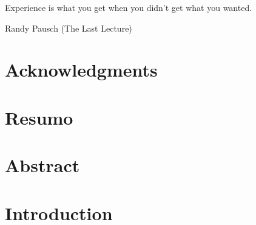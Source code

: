 \documentclass[11pt,a4paper,twoside]{book} %
\begin{document}
	
	\thispagestyle{empty}
	
	
	\newpage
	\thispagestyle{plain}
	
	\newpage
	\thispagestyle{plain}
	\mbox{}
	
	
	\thispagestyle{empty}

	\vspace*{0.8\textheight}
	\setlength{\epigraphwidth}{9cm}
	\renewcommand{\textflush}{flushright}
	\epigraph{Experience is what you get when you didn’t get what you wanted.}
	            {Randy Pausch (The Last Lecture)}

	\cleardoublepage
	
	\chapter*{Acknowledgments}
	

	\newpage
	\thispagestyle{plain}
	\mbox{}
		
	\chapter*{Resumo}
	
	
	\newpage
	\thispagestyle{plain}
	\mbox{}
	
	\chapter*{Abstract}
	
	
	\newpage
	\thispagestyle{plain}
	\mbox{}
	
	\tableofcontents{}
	
	\newpage
	\thispagestyle{plain}
	\mbox{}
	
	\cleardoublepage
	\listoffigures
	\newpage
	\thispagestyle{plain}
	\mbox{}	
	\cleardoublepage
	\listoftables

	\chapter*{}
	\newpage
	

	
	\chapter{Introduction}
         
		\mbox{}
\end{document}
